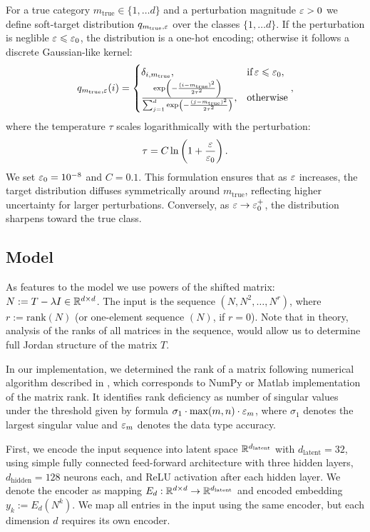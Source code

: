 For a true category $m_{\mathrm{true}} \in \{1, \dots d\}$ and a perturbation magnitude $\varepsilon > 0$ we define soft-target distribution $q_{m_{\mathrm{true}}, \varepsilon}$ over the classes $\{1, \dots d\}$. If the perturbation is neglible $\varepsilon \leqslant\varepsilon_0$, the distribution is a one-hot encoding; otherwise it follows a discrete Gaussian-like kernel:
\begin{equation}\label{eq:soft-target}
    q_{m_{\mathrm{true}}, \varepsilon}(i) = \begin{cases}
        \delta_{i, m_{\mathrm{true}}}, & \text{if} \, \varepsilon \leqslant \varepsilon_0, \\
        \frac{\exp\left( - \frac{(i - m_{\mathrm{true}})^2}{2\tau^2} \right)}{\sum_{j=1}^d \exp\left( - \frac{(j - m_{\mathrm{true}})^2}{2\tau^2} \right)}, & \text{otherwise}
    \end{cases},
\end{equation}
where the temperature $\tau$ scales logarithmically with the perturbation:
\begin{equation*}
\tau = C \ln\left(1 + \frac{\varepsilon}{\varepsilon_0}\right).
\end{equation*}
We set $\varepsilon_0 = 10^{-8}$ and $C=0.1$. This formulation ensures that as $\varepsilon$ increases, the target distribution diffuses symmetrically around $m_{\mathrm{true}}$, reflecting higher uncertainty for larger perturbations. Conversely, as $\varepsilon \to \varepsilon_0^+$, the distribution sharpens toward the true class.


\subsection*{Model}
As features to the model we use powers of the shifted matrix: $N := T - \lambda I \in \mathbb{R}^{d \times d}$. The input is the sequence $(N, N^2, \dots, N^r)$, where $r := \mathrm{rank}(N)$ (or one-element sequence $(N)$, if $r = 0$). Note that in theory, analysis of the ranks of all matrices in the sequence, would allow us to determine full Jordan structure of the matrix $T$. 

In our implementation, we determined the rank of a matrix following numerical algorithm described in \cite{Press2007}, which corresponds to NumPy or Matlab implementation of the matrix rank. It identifies rank deficiency as number of singular values under the threshold given by formula $\sigma_1 \cdot \max(m, n)\cdot \varepsilon_m$, where $\sigma_1$ denotes the largest singular value and $\varepsilon_m$ denotes the data type accuracy.

First, we encode the input sequence into latent space $\mathbb{R}^{d_\mathrm{latent}}$ with $d_\mathrm{latent}=32$, using simple fully connected feed-forward architecture with three hidden layers, $d_{\mathrm{hidden}}=128$ neurons each, and ReLU activation after each hidden layer. We denote the encoder as mapping $E_d : \mathbb{R}^{d \times d} \rightarrow \mathbb{R}^{d_\mathrm{latent}}$ and encoded embedding $y_k := E_d(N^k)$. We map all entries in the input using the same encoder, but each dimension $d$ requires its own encoder.

